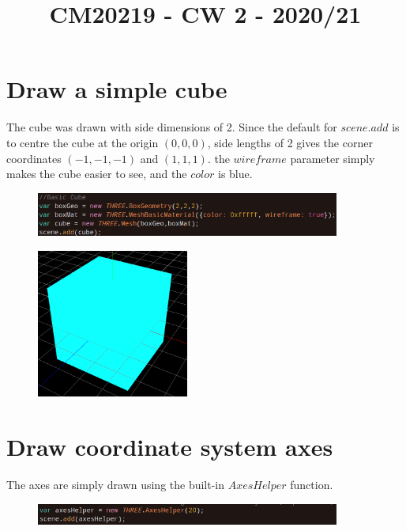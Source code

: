 \documentclass[12pt]{article}
\title{CM20219 - CW 2 - 2020/21}
\author{}
\begin{document}
\maketitle
\onehalfspacing
\section{Draw a simple cube}
The cube was drawn with side dimensions of 2. Since the default for $scene.add$ is to centre the cube
at the origin $(0,0,0)$, side lengths of 2 gives the corner coordinates $(-1,-1,-1)$ and $(1,1,1)$.
the $wireframe$ parameter simply makes the cube easier to see, and the $color$ is blue.
\begin{figure}[ht]  
    \centering
    \includegraphics[width=10cm]{1.png}
    \label{fig:1}
    \caption{}
  \end{figure}
  \begin{figure}[ht]  
    \centering
    \includegraphics[width=5cm]{14.png}
    \label{fig:1}
    \caption{}
  \end{figure}
\section{Draw coordinate system axes}
The axes are simply drawn using the built-in $AxesHelper$ function.
\begin{figure}[ht]  
    \centering
    \includegraphics[width=10cm]{2.png}
    \label{fig:2}
    \caption{}
  \end{figure}
\end{document}
